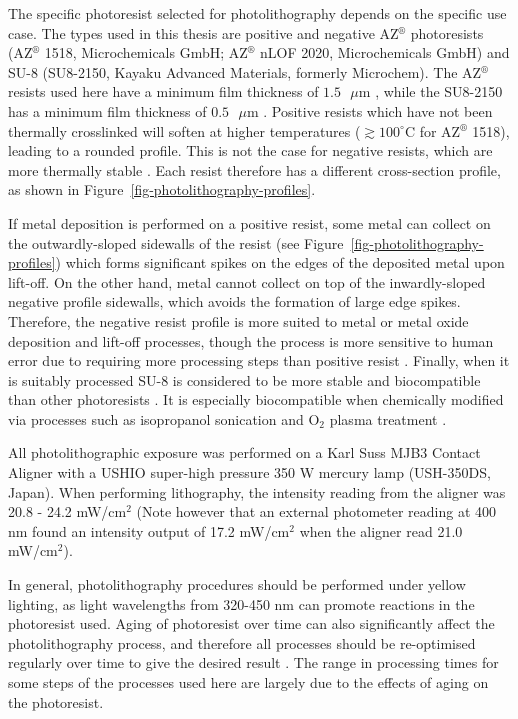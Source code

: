 \documentclass[
  a4paper,
]{scrbook}
\begin{document}
The specific photoresist selected for photolithography depends on the
specific use case. The types used in this thesis are positive and
negative AZ\(^\circledR\) photoresists (AZ\(^\circledR\) 1518,
Microchemicals GmbH; AZ\(^\circledR\) nLOF 2020, Microchemicals GmbH)
and SU-8 (SU8-2150, Kayaku Advanced Materials, formerly Microchem). The
AZ\(^\circledR\) resists used here have a minimum film thickness of
\(1.5\textrm{ } \mu \textrm{m}\) \autocite{Microchemicals}, while the
SU8-2150 has a minimum film thickness of
\(0.5\textrm{ } \mu \textrm{m}\) \autocite{Kayaku}. Positive resists
which have not been thermally crosslinked will soften at higher
temperatures (\(\gtrsim 100^\circ\)C for AZ\(^\circledR\) 1518), leading
to a rounded profile. This is not the case for negative resists, which
are more thermally stable \autocite{Microchemicals}. Each resist
therefore has a different cross-section profile, as shown in
Figure~\ref{fig-photolithography-profiles}.

If metal deposition is performed on a positive resist, some metal can
collect on the outwardly-sloped sidewalls of the resist (see
Figure~\ref{fig-photolithography-profiles}) which forms significant
spikes on the edges of the deposited metal upon lift-off. On the other
hand, metal cannot collect on top of the inwardly-sloped negative
profile sidewalls, which avoids the formation of large edge spikes.
Therefore, the negative resist profile is more suited to metal or metal
oxide deposition and lift-off processes, though the process is more
sensitive to human error due to requiring more processing steps than
positive resist \autocite{Microchemicals}. Finally, when it is suitably
processed SU-8 is considered to be more stable and biocompatible than
other photoresists \autocite{Albarghouthi2022}. It is especially
biocompatible when chemically modified via processes such as isopropanol
sonication and O\(_2\) plasma treatment \autocite{Chen2021}.

All photolithographic exposure was performed on a Karl Suss MJB3 Contact
Aligner with a USHIO super-high pressure 350 W mercury lamp (USH-350DS,
Japan). When performing lithography, the intensity reading from the
aligner was 20.8 - 24.2 mW/cm\(^2\) (Note however that an external
photometer reading at 400 nm found an intensity output of 17.2
mW/cm\(^2\) when the aligner read 21.0 mW/cm\(^2\)).

In general, photolithography procedures should be performed under yellow
lighting, as light wavelengths from 320-450 nm can promote reactions in
the photoresist used. Aging of photoresist over time can also
significantly affect the photolithography process, and therefore all
processes should be re-optimised regularly over time to give the desired
result \autocite{Microchemicals}. The range in processing times for some
steps of the processes used here are largely due to the effects of aging
on the photoresist.
\end{document}
